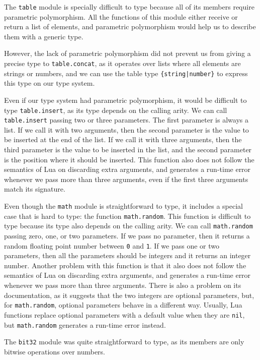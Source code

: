 The \texttt{table} module is specially difficult to type because
all of its members require parametric polymorphism.
All the functions of this module either receive or return a list
of elements, and parametric polymorphism would help us to describe
them with a generic type.

However, the lack of parametric polymorphism did not prevent us from
giving a precise type to \texttt{table.concat}, as it operates over lists
where all elements are strings or numbers, and we can use the table type
\texttt{\{string|number\}} to express this type on our type system.

Even if our type system had parametric polymorphism, it would
be difficult to type \texttt{table.insert}, as its type depends on
the calling arity.
We can call \texttt{table.insert} passing two or three parameters.
The first parameter is always a list.
If we call it with two arguments, then the second parameter
is the value to be inserted at the end of the list.
If we call it with three arguments, then the third parameter
is the value to be inserted in the list, and the second
parameter is the position where it should be inserted.
This function also does not follow the semantics of Lua on
discarding extra arguments, and generates a run-time error whenever
we pass more than three arguments, even if the first three arguments
match its signature.

Even though the \texttt{math} module is straightforward to type,
it includes a special case that is hard to type: the function \texttt{math.random}.
This function is difficult to type because its type also depends
on the calling arity.
We can call \texttt{math.random} passing zero, one, or two parameters.
If we pass no parameter, then it returns a random floating point
number between \texttt{0} and \texttt{1}.
If we pass one or two parameters, then all the parameters should be
integers and it returns an integer number.
Another problem with this function is that it also does not follow
the semantics of Lua on discarding extra arguments, and generates
a run-time error whenever we pass more than three arguments.
There is also a problem on its documentation, as it suggests that
the two integers are optional parameters, but, for \texttt{math.random},
optional parameters behave in a different way.
Usually, Lua functions replace optional parameters with a default value
when they are \texttt{nil}, but \texttt{math.random} generates a run-time
error instead.

The \texttt{bit32} module was quite straightforward to type,
as its members are only bitwise operations over numbers.

